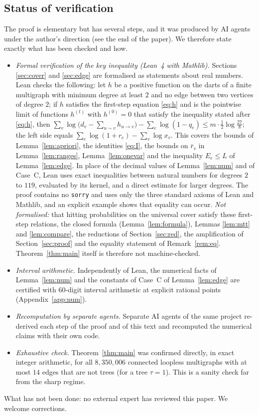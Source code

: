 \documentclass[11pt]{amsart}
\theoremstyle{plain}
\theoremstyle{remark}
\newcommand{\code}[1]{\texttt{#1}}
\newcommand{\rb}{\bar r}
\begin{document}
\subsection*{Status of verification}
The proof is elementary but has several steps, and it was produced by AI agents under the author's direction (see
the end of the paper). We therefore state exactly what has been checked and how.
\begin{itemize}
\item \emph{Formal verification of the key inequality (Lean~4 with Mathlib).} Sections \ref{sec:cover} and
  \ref{sec:edge} are formalised as statements about real numbers. Lean checks the following: let $h$ be a positive
  function on the darts of a finite multigraph with minimum degree at least $2$ and no edge between two vertices of
  degree $2$; if $h$ satisfies the first-step equation \eqref{eq:h} and is the pointwise limit of functions
  $h^{(t)}$ with $h^{(0)}=0$ that satisfy the inequality stated after \eqref{eq:h}, then
  $\sum_v\log\bigl(d_v-\sum_{u\sim v}h_{u\to v}\bigr)-\sum_e\log(1-q_e)\le m\cdot\frac12\log\frac{27}{8}$; the left
  side equals $\sum_e\log(1+r_e)-\sum_v\log x_v$. This covers the bounds of Lemma~\ref{lem:apriori}, the
  identities \eqref{eq:I}, the bounds on $\rb_v$ in Lemma~\ref{lem:ranges}, Lemma~\ref{lem:onevar} and the
  inequality $E_e\le L$ of Lemma~\ref{lem:edge}. In place of the decimal values of Lemma~\ref{lem:num} and of
  Case~C, Lean uses exact inequalities between natural numbers for degrees $2$ to $119$, evaluated by its kernel,
  and a direct estimate for larger degrees. The proof contains no \code{sorry} and uses only the three standard
  axioms of Lean and Mathlib, and an explicit example shows that equality can occur.
  \emph{Not formalised:} that hitting probabilities on the universal cover satisfy these first-step relations, the
  closed formula (Lemma~\ref{lem:formula}), Lemmas \ref{lem:mtt} and \ref{lem:compare}, the reductions of
  Section~\ref{sec:red}, the amplification of Section~\ref{sec:proof} and the equality statement of
  Remark~\ref{rem:eq}. Theorem~\ref{thm:main} itself is therefore not machine-checked.
\item \emph{Interval arithmetic.} Independently of Lean, the numerical facts of Lemma~\ref{lem:num} and the
  constants of Case~C of Lemma~\ref{lem:edge} are certified with $60$-digit interval arithmetic at explicit rational
  points (Appendix~\ref{app:num}).
\item \emph{Recomputation by separate agents.} Separate AI agents of the same project re-derived each step of the
  proof and of this text and recomputed the numerical claims with their own code.
\item \emph{Exhaustive check.} Theorem~\ref{thm:main} was confirmed directly, in exact integer arithmetic, for all
  $8{,}350{,}006$ connected loopless multigraphs with at most $14$ edges that are not trees (for a tree $\tau=1$).
  This is a sanity check far from the sharp regime.
\end{itemize}
What has not been done: no external expert has reviewed this paper. We welcome corrections.
\end{document}
